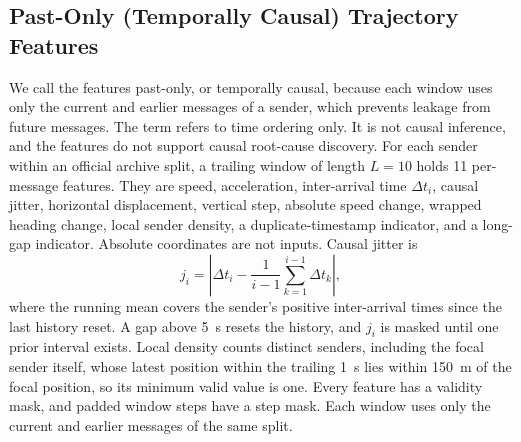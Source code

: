 \documentclass[preprint,12pt,numafflabel]{elsarticle}
\begin{document}
\subsection{Past-Only (Temporally Causal) Trajectory Features}
We call the features past-only, or temporally causal, because each window uses only the current and earlier messages of a sender, which prevents leakage from future messages. The term refers to time ordering only. It is not causal inference, and the features do not support causal root-cause discovery. For each sender within an official archive split, a trailing window of length $L=10$ holds 11 per-message features. They are speed, acceleration, inter-arrival time $\Delta t_i$, causal jitter, horizontal displacement, vertical step, absolute speed change, wrapped heading change, local sender density, a duplicate-timestamp indicator, and a long-gap indicator. Absolute coordinates are not inputs. Causal jitter is
\begin{equation}
j_i = \left|\Delta t_i - \frac{1}{i-1}\sum_{k=1}^{i-1}\Delta t_k\right|,
\end{equation}
where the running mean covers the sender's positive inter-arrival times since the last history reset. A gap above 5~s resets the history, and $j_i$ is masked until one prior interval exists. Local density counts distinct senders, including the focal sender itself, whose latest position within the trailing 1~s lies within 150~m of the focal position, so its minimum valid value is one. Every feature has a validity mask, and padded window steps have a step mask. Each window uses only the current and earlier messages of the same split.
\end{document}
